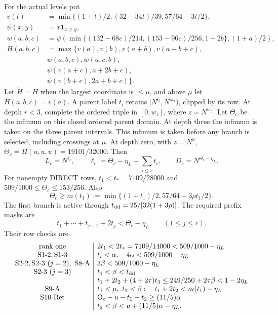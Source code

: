 For the actual levels put
\[
\begin{aligned}
v(t)&=\min\{(1+t)/2,(32-34t)/39,57/64-3t/2\},\\
\psi(x,y)&=x\mathbf1_{x\ge y},\\
w(a,b,c)&=\psi\!\left(\min\{(132-68c)/214,(153-96c)/256,1-2b\},(1+a)/2\right),\\
H(a,b,c)&=\max\{v(a),v(b),v(a+b),v(a+b+c),\\
 &w(a,b,c),w(a,c,b),\\
 &\psi(v(a+c),a+2b+c),\\
 &\psi(v(b+c),2a+b+c)\}.
\end{aligned}
 \tag{2.17d}\label{p2:eq:row-level-function}
\]
Let $\widetilde H=H$ when the largest coordinate is $\le\mu$,
and above $\mu$ let $\widetilde H(a,b,c)=v(a)$.
A parent label $t_i$ retains $[N^{t_i},N^{\rho t_i})$, clipped by its row.
At depth $r<3$, complete the ordered triple in $[0,w_z]$, where $z=N^{w_z}$.
Let $\Theta_c$ be the infimum on this closed ordered parent domain.
At depth three the infimum is taken on the three parent intervals.
This infimum is taken before any branch is selected, including crossings at $\mu$.
At depth zero, with $z=N^u$, $\Theta_c=H(u,u,u)=19101/32000$.
Then
\[
 L_c=N^{\ell_c},\qquad \ell_c=\Theta_c-\eta_L-\sum_{i\le r}t_i,
 \qquad D_c=N^{\Theta_c-\eta_L}.
 \tag{2.17e}\label{p2:eq:row-relative-level}
\]
For nonempty DIRECT rows, $t_1<t_*=7109/28000$ and
$509/1000\le\Theta_c\le153/256$. Also
\[
 \Theta_c\ge m(t_1):=\min\{(1+t_1)/2,57/64-3\rho t_1/2\}.
 \tag{2.17f}\label{p2:eq:row-level-floor}
\]
The first branch is active through $t_{\rm dd}=25/[32(1+3\rho)]$.
The required prefix masks are
\[
 t_1+\cdots+t_{j-1}+2t_j<\Theta_c-\eta_L
 \qquad(1\le j\le r).
 \tag{2.17g}\label{p2:eq:direct-prefix-mask}
\]
Their row checks are
\[
\begin{array}{c|l}
\text{rank one}&2t_1<2t_*=7109/14000<509/1000-\eta_L\\
\mathrm{S1\hbox{-}2,S1\hbox{-}3}&t_i<\alpha,\quad4\alpha<509/1000-\eta_L\\
\mathrm{S2\hbox{-}2,S2\hbox{-}3}\ (j=2),\ \mathrm{S8\hbox{-}A}
 &3\beta<509/1000-\eta_L\\
\mathrm{S2\hbox{-}3}\ (j=3)&t_1<\beta<t_{\rm dd}\\
 &t_1+2t_2+(4+2\tau)t_3\le249/250+2\tau\beta<1-2\eta_L\\
\mathrm{S9\hbox{-}A}&t_1<\mu,\ t_2<\beta:\quad t_1+2t_2<m(t_1)-\eta_L\\
\mathrm{S10\hbox{-}Ret}&\Theta_c-u-t_1-t_2\ge(11/5)\alpha\\
 &t_2<\beta<u+(11/5)\alpha-\eta_L.
\end{array}
\]
